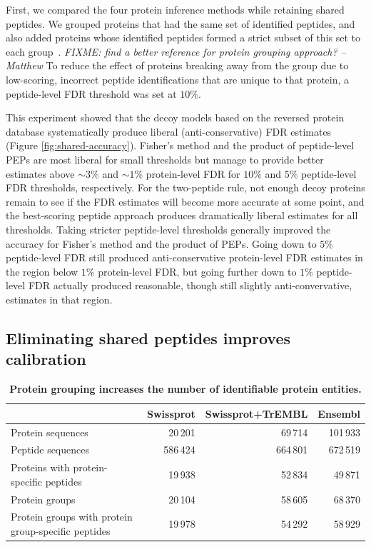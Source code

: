 \documentclass{article}
\begin{document}
First, we compared the four protein inference methods while retaining
shared peptides. We grouped proteins that had the same set of
identified peptides, and also added proteins whose identified peptides
formed a strict subset of this set to each
group~\cite{serang2012review}.  {\em FIXME: find a better reference
  for protein grouping approach? --Matthew} To reduce the effect of
proteins breaking away from the group due to low-scoring, incorrect
peptide identifications that are unique to that protein, a
peptide-level FDR threshold was set at $10\%$.

This experiment showed that the decoy models based on the reversed
protein database systematically produce liberal (anti-conservative)
FDR estimates (Figure \ref{fig:shared-accuracy}). Fisher's method and
the product of peptide-level PEPs are most liberal for small
thresholds but manage to provide better estimates above $\sim 3\%$ and
$\sim 1\%$ protein-level FDR for $10\%$ and $5\%$ peptide-level FDR
thresholds, respectively. For the two-peptide rule, not enough decoy
proteins remain to see if the FDR estimates will become more accurate
at some point, and the best-scoring peptide approach produces
dramatically liberal estimates for all thresholds. Taking stricter
peptide-level thresholds generally improved the accuracy for Fisher's
method and the product of PEPs. Going down to $5\%$ peptide-level FDR
still produced anti-conservative protein-level FDR estimates in the
region below $1\%$ protein-level FDR, but going further down to $1\%$
peptide-level FDR actually produced reasonable, though still slightly
anti-convervative, estimates in that region.

\subsection*{Eliminating shared peptides improves calibration}

\begin{table}
\caption{\label{tab:duplicate-proteins}\textbf{Protein grouping
    increases the number of identifiable protein entities.}}
\scriptsize
\begin{center}
\begin{tabular}{lrrr}
\hline
& Swissprot & Swissprot+TrEMBL & Ensembl\\
\hline
Protein sequences & 20\,201 & 69\,714 & 101\,933\\
Peptide sequences & 586\,424 & 664\,801 & 672\,519\\
Proteins with protein-specific peptides & 19\,938 & 52\,834 &
49\,871\\
Protein groups & 20\,104 & 58\,605 & 68\,370\\
Protein groups with protein group-specific peptides & 19\,978 &
54\,292 & 58\,929\\
\hline
\end{tabular}
\end{center}
\end{table}
\end{document}
